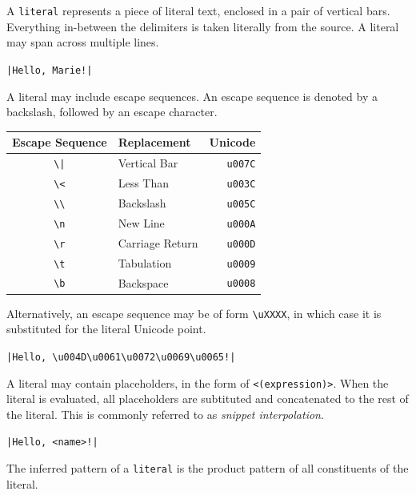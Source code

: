 \documentclass{article}
\begin{document}
A \texttt{literal} represents a piece of literal text, enclosed in a pair of vertical bars.
Everything in-between the delimiters is taken literally from the source.
A literal may span across multiple lines.

\begin{center}
    \verb/|Hello, Marie!|/
\end{center}

A literal may include escape sequences. An escape sequence is denoted by a backslash, followed
by an escape character.

\begin{center}
\begin{tabular}{ c|l r }
    \hline
    Escape Sequence & Replacement & Unicode \\[1ex]
    \hline
    \verb/\|/ & Vertical Bar    & \texttt{u007C} \\ 
    \verb|\<| & Less Than       & \texttt{u003C} \\
    \verb|\\| & Backslash       & \texttt{u005C} \\
    \verb|\n| & New Line        & \texttt{u000A} \\ 
    \verb|\r| & Carriage Return & \texttt{u000D} \\ 
    \verb|\t| & Tabulation      & \texttt{u0009} \\ 
    \verb|\b| & Backspace       & \texttt{u0008} \\
\end{tabular}
\end{center}

Alternatively, an escape sequence may be of form \verb|\uXXXX|, in which case it is substituted for
the literal Unicode point.

\begin{center}
    \verb/|Hello, \u004D\u0061\u0072\u0069\u0065!|/
\end{center}

A literal may contain placeholders, in the form of \texttt{<(expression)>}. When the literal is evaluated, all
placeholders are subtituted and concatenated to the rest of the literal. This is commonly referred to as
\emph{snippet interpolation}.

\begin{center}
    \verb/|Hello, <name>!|/
\end{center}

The inferred pattern of a \texttt{literal} is the product pattern of all constituents of the literal.
\end{document}
